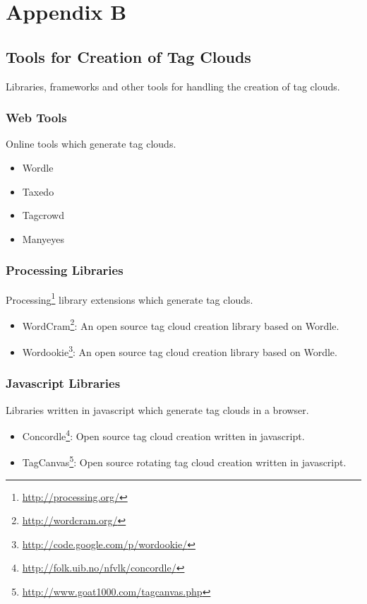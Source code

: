 \chapter{Appendix B}

\section{Tools for Creation of Tag Clouds}

Libraries, frameworks and other tools for handling the creation of tag clouds.

\subsection{Web Tools}

Online tools which generate tag clouds.

	\begin{itemize}
		\item Wordle 
		\item Taxedo
		\item Tagcrowd
		\item Manyeyes
	\end{itemize}


\subsection{Processing Libraries}

Processing\footnote{\url{http://processing.org/}} library extensions which generate tag clouds. 

\begin{itemize}

	\item WordCram\footnote{\url{http://wordcram.org/}}: An open source tag cloud creation library based on Wordle.

	\item Wordookie\footnote{\url{http://code.google.com/p/wordookie/}}: An open source tag cloud creation library based on Wordle.
	 
\end{itemize}


\subsection{Javascript Libraries} 

Libraries written in javascript which generate tag clouds in a browser.

\begin{itemize}

	\item Concordle\footnote{\url{http://folk.uib.no/nfvlk/concordle/}}: Open source tag cloud creation written in javascript.

	\item TagCanvas\footnote{\url{http://www.goat1000.com/tagcanvas.php}}: Open source rotating tag cloud creation written in javascript.
	
\end{itemize}


